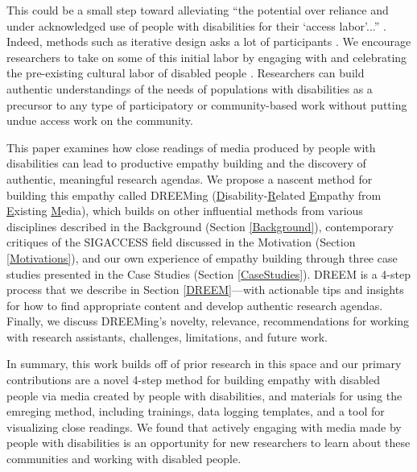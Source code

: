 This could be a small step toward alleviating ``the potential over reliance and under acknowledged use of people with disabilities for their `access labor'...'' \cite{mackWhatWeMean2021,bennettBiographicalPrototypesReimagining2019}. Indeed, methods such as iterative design asks a lot of participants \cite{dourishBeingIteratedAffective2020}.
We encourage researchers to take on some of this initial labor by engaging with and celebrating the pre-existing cultural labor of disabled people \cite{piepzna-samarasinhaCareWorkDreaming2018}. Researchers can build authentic understandings of the needs of populations with disabilities as a precursor to any type of participatory or community-based work without putting undue access work on the community.  

This paper examines how close readings of media produced by people with disabilities can lead to productive empathy building and the discovery of authentic, meaningful research agendas. We propose a nascent method for building this empathy called DREEMing (\underline{D}isability-\underline{R}elated \underline{E}mpathy from \underline{E}xisting \underline{M}edia), which builds on other influential methods from various disciplines described in the Background (Section \ref{Background}), contemporary critiques of the SIGACCESS field discussed in the Motivation (Section \ref{Motivations}), and our own experience of empathy building through three case studies presented in the Case Studies (Section \ref{CaseStudies}). DREEM is a 4-step process that we describe in Section \ref{DREEM}—with actionable tips and insights for how to find appropriate content and develop authentic research agendas. Finally, we discuss DREEMing's novelty, relevance, recommendations for working with research assistants, challenges, limitations, and future work.

In summary, this work builds off of prior research in this space \cite{bennettPromiseEmpathyDesign2019,plattnerDesignThinkingUnderstand2011,wrightEmpathyExperienceHCI2008,shinoharaDesignSocialAccessibility2020} and our primary contributions are a novel 4-step method for building empathy with disabled people via media created by people with disabilities, and materials for using the emreging method, including trainings, data logging templates, and a tool for visualizing close readings. We found that actively engaging with media made by people with disabilities is an opportunity for new researchers to learn about these communities and working with disabled people.

